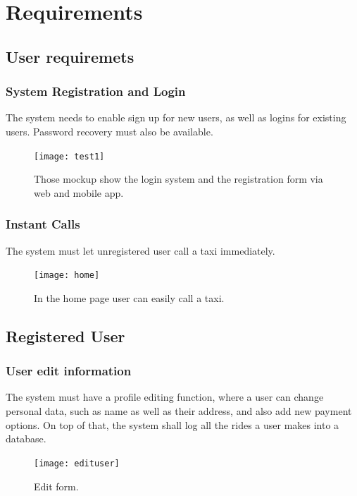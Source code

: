 \section{Requirements}
	\subsection {User requiremets}
		\subsubsection {System Registration and Login}
			The system needs to enable sign up for new users, as well as logins for existing users. Password recovery must also be available.
			\begin{figure}[h!]
				\texttt{[image: test1]}
				\caption{Those mockup show the login system and the registration form via web and mobile app.}
			\end{figure}
			\newpage
		\subsubsection {Instant Calls}
			The system must let unregistered user call a taxi immediately.
			\begin{figure}[h!]
				\texttt{[image: home]}
				\caption{In the home page user can easily call a taxi.}
			\end{figure}
			\newpage
	\subsection {Registered User}
		\subsubsection {User edit information}
			The system must have a profile editing function, where a user can change personal data, such as name as well as their address,
			and also add new payment options. On top of that, the system shall log all the rides a user makes into a database.
			\begin{figure}[h!]
				\texttt{[image: edituser]}
				\caption{Edit form.}
			\end{figure}
			\newpage

